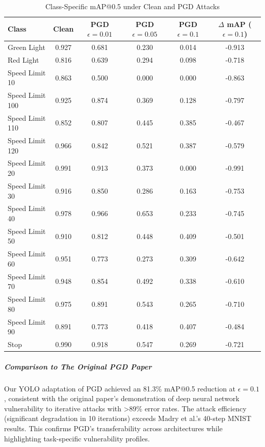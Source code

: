 \documentclass[../main.tex]{subfiles}
\begin{document}
\begin{table}[H]
\caption{Class-Specific mAP@0.5 under Clean and PGD Attacks}
    \label{tab:yolo_pgd_class_results}
    \centering
    \footnotesize
    \begin{tabular}{@{\hspace{0.3cm}}lS[table-format=1.3]S[table-format=1.3]S[table-format=1.3]S[table-format=1.3]S[table-format=-1.3]@{\hspace{0.3cm}}}
        \toprule
        \textbf{Class} & {\textbf{Clean}} & {\textbf{PGD $\epsilon=0.01$}} & {\textbf{PGD $\epsilon=0.05$}} & {\textbf{PGD $\epsilon=0.1$}} & {\textbf{$\Delta$ mAP ($\epsilon=0.1$)}} \\
        \midrule
        Green Light     & 0.927 & 0.681 & 0.230 & 0.014 & -0.913 \\
        Red Light       & 0.816 & 0.639 & 0.294 & 0.098 & -0.718 \\
        Speed Limit 10  & 0.863 & 0.500 & 0.000 & 0.000 & -0.863 \\
        Speed Limit 100 & 0.925 & 0.874 & 0.369 & 0.128 & -0.797 \\
        Speed Limit 110 & 0.852 & 0.807 & 0.445 & 0.385 & -0.467 \\
        Speed Limit 120 & 0.966 & 0.842 & 0.521 & 0.387 & -0.579 \\
        Speed Limit 20  & 0.991 & 0.913 & 0.373 & 0.000 & -0.991 \\
        Speed Limit 30  & 0.916 & 0.850 & 0.286 & 0.163 & -0.753 \\
        Speed Limit 40  & 0.978 & 0.966 & 0.653 & 0.233 & -0.745 \\
        Speed Limit 50  & 0.910 & 0.812 & 0.448 & 0.409 & -0.501 \\
        Speed Limit 60  & 0.951 & 0.773 & 0.273 & 0.309 & -0.642 \\
        Speed Limit 70  & 0.948 & 0.854 & 0.492 & 0.338 & -0.610 \\
        Speed Limit 80  & 0.975 & 0.891 & 0.543 & 0.265 & -0.710 \\
        Speed Limit 90  & 0.891 & 0.773 & 0.418 & 0.407 & -0.484 \\
        Stop            & 0.990 & 0.918 & 0.547 & 0.269 & -0.721 \\
        \bottomrule
    \end{tabular}
\end{table}

\subparagraph{Comparison to The Original PGD Paper}  
Our YOLO adaptation of PGD achieved an 81.3\% mAP@0.5 reduction at $\epsilon=0.1$, consistent with the original paper's demonstration of deep neural network vulnerability to iterative attacks with >89\% error rates\cite{madry2018towardspgd}. The attack efficiency (significant degradation in 10 iterations) exceeds Madry et al.'s 40-step MNIST results. This confirms PGD's transferability across architectures while highlighting task-specific vulnerability profiles.
\end{document}
